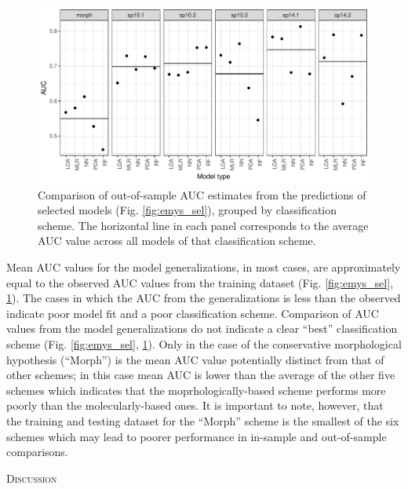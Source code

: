 \documentclass[12pt,letterpaper]{article}
\renewcommand{\section}[1]{%
\bigskip
\begin{center}
\begin{Large}
\normalfont\scshape #1
\medskip
\end{Large}
\end{center}}
\begin{document}
\begin{figure}[ht]
  \centering
  \includegraphics[height = \textheight, width = \textwidth, keepaspectratio = true]{figure/emys_oos_sel}
  \caption{Comparison of out-of-sample AUC estimates from the predictions of selected models (Fig. \ref{fig:emys_sel}), grouped by classification scheme. The horizontal line in each panel corresponds to the average AUC value across all models of that classification scheme.}
  \label{fig:emys_oos}
\end{figure}

Mean AUC values for the model generalizations, in most cases, are approximately equal to the observed AUC values from the training dataset (Fig. \ref{fig:emys_sel}, \ref{fig:emys_oos}). The  cases in which the AUC from the  generalizations is less than the observed indicate poor model fit and a poor classification scheme. Comparison of AUC values from the model generalizations do not indicate a clear ``best'' classification scheme (Fig. \ref{fig:emys_sel}, \ref{fig:emys_oos}). Only in the case of the conservative morphological hypothesis (``Morph'') is the mean AUC value potentially distinct from that of other schemes; in this case mean AUC is lower than the average of the other five schemes which indicates that the moprhologically-based scheme performs more poorly than the molecularly-based ones. It is important to note, however, that the training and testing dataset for the ``Morph'' scheme is the smallest of the six schemes which may lead to poorer performance in in-sample and out-of-sample comparisons.





\section{Discussion}
\end{document}
